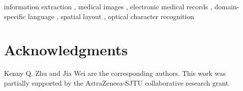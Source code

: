 \documentclass[final,3p,times,twocolumn]{elsarticle}
\begin{document}
\begin{frontmatter}
\begin{abstract}
\end{abstract}

\begin{keyword}
information extraction \sep
medical images \sep
electronic medical records \sep
domain-specific language \sep
spatial layout \sep
optical character recognition



\end{keyword}

\end{frontmatter}






%






\section*{Acknowledgments}
Kenny Q. Zhu and Jia Wei are the corresponding authors. This work
was partially supported by the AstraZeneca-SJTU collaborative
research grant.








%
%
%
\end{document}

